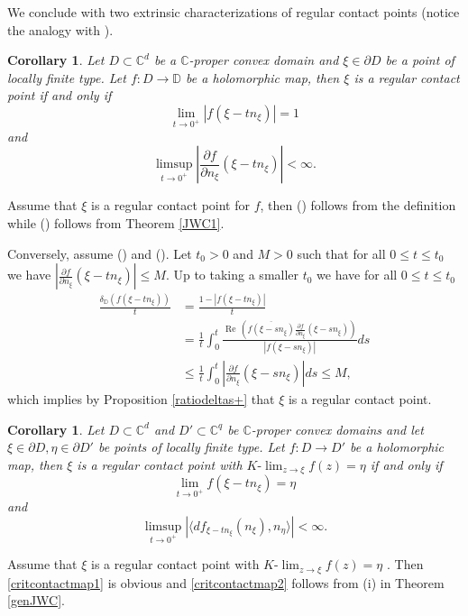 \documentclass[11pt, reqno]{amsart}
\numberwithin{equation}{section}
\newtheorem{corollary}[theorem]{Corollary}
\theoremstyle{definition}
\newcommand{\C}{\mathbb{C}}
\newcommand{\D}{\mathbb{D}}
\renewcommand{\Re}{{\operatorname{Re}\,}}
\begin{document}
{{{		We conclude with two extrinsic characterizations of regular contact points (notice the analogy with \cite[Propositions 1.2.6, 1.2.8]{Abatebook}).
		
		\begin{corollary}\label{critcontactfun}
			Let $D\subset\C^d$ be a $\C$-proper convex domain and $\xi\in\partial D$ be a point of locally finite type. Let
			$f\colon D\to\D$ be a holomorphic map, then $\xi$ is a regular contact point if and only if
			\begin{equation}\label{critcontactfun1}
				\lim_{t\to0^+}|f(\xi-tn_\xi)|=1
			\end{equation}
			and
			\begin{equation}\label{critcontactfun2}
				\limsup_{t\to0^+}\left|\frac{\partial f}{\partial n_\xi}(\xi-tn_\xi)\right|<\infty.	
			\end{equation}
		\end{corollary}
		\proof 
		Assume that $\xi$ is a regular contact point for $f$, then () follows from the definition while () follows from  Theorem \ref{JWC1}.
		
		Conversely, assume () and ().
		Let $t_0>0$ and $M> 0$ such that for all $0\leq t\leq t_0$ we have $\left|\frac{\partial f}{\partial n_\xi}(\xi-tn_\xi)\right|\leq M.$ 
		Up to taking a smaller $t_0$ we have  for all $0\leq t\leq t_0$
		\begin{align*}\frac{\delta_\D(f(\xi-tn_\xi))}{t}&=\frac{1-|f(\xi-tn_\xi)|}{t}\\&=\frac{1}{t}\int_0^{t}\frac{\Re(\overline{f(\xi-sn_\xi)}\frac{\partial f}{\partial n_\xi}(\xi-sn_\xi))}{|f(\xi-sn_\xi)|}ds\\&\leq\frac{1}{t}\int_0^{t}\left|\frac{\partial f}{\partial n_\xi}(\xi-sn_\xi)\right|ds \leq M,
		\end{align*}
		which implies by Proposition \ref{ratiodeltas+} that $\xi$ is a regular contact point.

	
	
	\begin{corollary}\label{critcontactmap}
		Let $D\subset\C^d$ and $D'\subset\C^{q}$ be  $\C$-proper convex domains and let $\xi\in\partial D,\eta\in \partial D'$ be  points of locally finite type. Let $f\colon D\to D'$ be a holomorphic map, then $\xi$ is a regular contact point  with  $K\textrm{-}\lim_{z\to\xi}f(z)=\eta$  if and only if
		\begin{equation}\label{critcontactmap1}
			\lim_{t\to0^+}f(\xi-tn_\xi)=\eta
		\end{equation}
		and
		\begin{equation}\label{critcontactmap2}
			\limsup_{t\to0^+}|\langle df_{\xi-tn_\xi}(n_\xi),n_\eta\rangle|<\infty.
		\end{equation}
	\end{corollary}
	\proof 
	Assume that $\xi$ is a regular contact point with  $K\textrm{-}\lim_{z\to\xi}f(z)=\eta$ . 
	Then \eqref{critcontactmap1} is obvious and \eqref{critcontactmap2} follows from  (i) in Theorem \ref{genJWC}.
	
}}}
\end{document}
